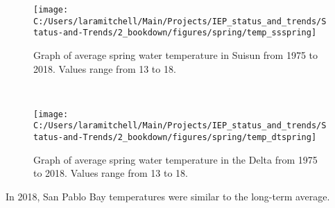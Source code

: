 \documentclass[
]{book}
\begin{document}
\begin{panel-grid}
\begin{columns-nocenter}
\begin{column40}
\end{column40}

\begin{column800}

\begin{expand}

\begin{figure}
\texttt{[image: C:/Users/laramitchell/Main/Projects/IEP\_status\_and\_trends/Status-and-Trends/2\_bookdown/figures/spring/temp\_ssspring]} \caption{Graph of average spring water temperature in Suisun from 1975 to 2018. Values range from 13 to 18.}\label{fig:unnamed-chunk-15}
\end{figure}

\end{expand}

\end{column800}

\begin{column40}

~

\end{column40}

\begin{column800}

\begin{expand}

\begin{figure}
\texttt{[image: C:/Users/laramitchell/Main/Projects/IEP\_status\_and\_trends/Status-and-Trends/2\_bookdown/figures/spring/temp\_dtspring]} \caption{Graph of average spring water temperature in the Delta from 1975 to 2018. Values range from 13 to 18.}\label{fig:unnamed-chunk-16}
\end{figure}

\end{expand}

\end{column800}

\end{columns-nocenter}

\begin{columns-nocenter}

\begin{column800}

In 2018, San Pablo Bay temperatures were similar to the long-term average.

\end{column800}

\begin{column40}

~


\end{column40}
\end{columns-nocenter}
\end{panel-grid}
\end{document}
